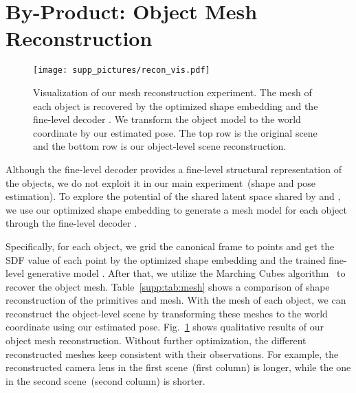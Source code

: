\documentclass{article}
\newcommand{\revise}[1]{\textcolor{revise}{#1}}
\begin{document}
\section{By-Product: Object Mesh Reconstruction}
\label{supp:sec:mesh}
\begin{figure}
    \centering
    \texttt{[image: supp\_pictures/recon\_vis.pdf]}
    \caption{Visualization of our mesh reconstruction experiment. The mesh of each object is recovered by the optimized shape embedding  and the fine-level decoder . We transform the object model to the world coordinate by our estimated pose. The top row is the original scene and the bottom row is our object-level scene reconstruction.}
    \label{fig:recon_vis}
\end{figure}
Although the fine-level decoder  provides a fine-level structural representation of the objects, we do not exploit it in our main experiment~(shape and pose estimation). To explore the potential of the shared latent space shared by  and , we use our optimized shape embedding  to generate a mesh model for each object through the fine-level decoder .

\begin{table}[!tp]
\centering
\caption{\revise{Comparison of shape reconstruction accuracy of our reconstructed primitives and mesh in CD metric () on REAL275.}}
\label{supp:tab:mesh}
\end{table} Specifically, for each object, we grid the canonical frame to  points and get the SDF value of each point by the optimized shape embedding  and the trained fine-level generative model . After that, we utilize the Marching Cubes algorithm~\cite{lorensen1987marching} to recover the object mesh. Table~\ref{supp:tab:mesh} shows a comparison of shape reconstruction of the primitives and mesh.
With the mesh of each object, we can reconstruct the object-level scene by transforming these meshes to the world coordinate using our estimated pose. Fig.~\ref{fig:recon_vis} shows qualitative results of our object mesh reconstruction. Without further optimization, the different reconstructed meshes keep consistent with their observations. For example, the reconstructed camera lens in the first scene~(first column) is longer, while the one in the second scene~(second column) is shorter. \setcounter{section}{2}
\end{document}
